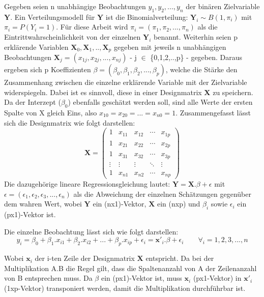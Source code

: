 \documentclass[12pt,]{article}
\begin{document}
Gegeben seien n unabhängige Beobachtungen \(y_1, y_2, ...,y_n\) der
binären Zielvariable \(\mathbf{Y}\). Ein Verteilungsmodell für
\(\mathbf{Y}\) ist die Binomialverteilung:
\(\mathbf{Y}_i \sim B(1, \pi_i)\) mit \(\pi_i = P(Y_i = 1)\). Für diese
Arbeit wird \(\pi_i = (\pi_1, \pi_2, ..., \pi_n)\) als die
Eintrittwahrscheinlichkeit von der einzelnen \(\mathbf{Y}_i\) benannt.
Weiterhin seien p erklärende Variablen
\(\mathbf{X}_0,\mathbf{X}_1,..,\mathbf{X}_p\) gegeben mit jeweils n
unabhängigen Beobachtungen
\(\mathbf{X}_j = (x_{1j}, x_{2j},..., x_{nj})\) - j \(\in\)
\{0,1,2,..,p\} - gegeben. Daraus ergeben sich p Koeffizienten
\(\beta = (\beta_0, \beta_1, \beta_2,..., \beta_p)\), welche die Stärke
den Zusammenhang zwischen die einzelne erklärende Variable mit der
Zielvariable widerspiegeln. Dabei ist es sinnvoll, diese in einer
Designmatrix \(\mathbf{X}\) zu speichern. Da der Interzept (\(\beta_0\))
ebenfalls geschätzt werden soll, sind alle Werte der ersten Spalte von X
gleich Eins, also \(x_{10} = x_{20} = ... = x_{n0} = 1\).
Zusammengefasst lässt sich die Designmatrix wie folgt darstellen: \[
\mathbf{X} =
 \begin{pmatrix}
    1 & x_{11} & x_{12} & \cdots & x_{1p} \\
    1 & x_{21} & x_{22} & \cdots & x_{2p} \\
    1 & x_{31} & x_{32} & \cdots & x_{3p} \\
    \vdots  & \vdots  & \vdots & \ddots & \vdots \\
    1 & x_{n1} & x_{n2} & \cdots & x_{np}
 \end{pmatrix}
\] Die dazugehörige lineare Regressionsgleichung lautet:
\(\mathbf{Y} = \mathbf{X}.\beta + \epsilon\) mit
\(\epsilon = (\epsilon_1, \epsilon_2, \epsilon_3, ..., \epsilon_n)\) als
die Abweichung der einzelnen Schätzungen gegenüber dem wahren Wert,
wobei \(\mathbf{Y}\) ein (nx1)-Vektor, \(\mathbf{X}\) ein (nxp) und
\(\beta_i\) sowie \(\epsilon_i\) ein (px1)-Vektor ist.

Die einzelne Beobachtung lässt sich wie folgt darstellen: \[
y_i = \beta_0 + \beta_1.x_{i1} + \beta_2.x_{i2} + ... + \beta_p.x_{ip} + \epsilon_i = \mathbf{x'}_i.\beta + \epsilon_i \qquad \forall_i = 1,2,3,...,n
\]

Wobei \(\mathbf{x}_i\) der i-ten Zeile der Designmatrix \(\mathbf{X}\)
entspricht. Da bei der Multiplikation A.B die Regel gilt, dass die
Spaltenanzahl von A der Zeilenanzahl von B entsprechen muss. Da
\(\beta\) ein (px1)-Vektor ist, muss \(\mathbf{x}_i\) (px1-Vektor) in
\(\mathbf{x'}_i\) (1xp-Vektor) transponiert werden, damit die
Multiplikation durchführbar ist.
\end{document}
